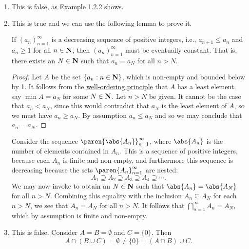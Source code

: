 \documentclass{lew98_solutions}
\begin{document}
\begin{solution}
    \begin{enumerate}
        \item This is false, as Example 1.2.2 shows.

        \item This is true and we can use the following lemma to prove it.
        \begin{lemma}
        \label{lem:ex1.2.3}
            If \( (a_n)_{n=1}^{\infty} \) is a decreasing sequence of positive integers, i.e., \( a_{n+1} \leq a_n \) and \( a_n \geq 1 \) for all \( n \in \mathbf{N} \), then \( (a_n)_{n=1}^{\infty} \) must be eventually constant. That is, there exists an \( N \in \mathbf{N} \) such that \( a_n = a_N \) for all \( n > N \).
        \end{lemma}

        \begin{proof}
            Let \( A \) be the set \( \{ a_n : n \in \mathbf{N} \} \), which is non-empty and bounded below by 1. It follows from the \href{https://en.wikipedia.org/wiki/Well-ordering_principle}{well-ordering principle} that \( A \) has a least element, say \( \min A = a_N \) for some \( N \in \mathbf{N} \). Let \( n > N \) be given. It cannot be the case that \( a_n < a_N \), since this would contradict that \( a_N \) is the least element of \( A \), so we must have \( a_n \geq a_N \). By assumption \( a_n \leq a_N \) and so we may conclude that \( a_n = a_N \).
        \end{proof}

        Consider the sequence \( \paren{ \abs{A_n} }_{n=1}^{\infty} \), where \( \abs{A_n} \) is the number of elements contained in \( A_n \). This is a sequence of positive integers, because each \( A_n \) is finite and non-empty, and furthermore this sequence is decreasing because the sets \( \paren{ A_n }_{n=1}^{\infty} \) are nested:
        \[
            A_1 \supseteq A_2 \supseteq A_3 \supseteq A_4 \supseteq \cdots.  
        \]
        We may now invoke  to obtain an \( N \in \mathbf{N} \) such that \( \abs{A_n} = \abs{A_N} \) for all \( n > N \). Combining this equality with the inclusion \( A_n \subseteq A_N \) for each \( n > N \), we see that \( A_n = A_N \) for all \( n > N \). It follows that \( \bigcap_{n=1}^{\infty} A_n = A_N \), which by assumption is finite and non-empty.

        \item This is false. Consider \( A = B = \emptyset \) and \( C = \{ 0 \} \). Then
        \[
            A \cap (B \cup C) = \emptyset \neq \{ 0 \} = (A \cap B) \cup C.
        \]


\end{enumerate}
\end{solution}
\end{document}
